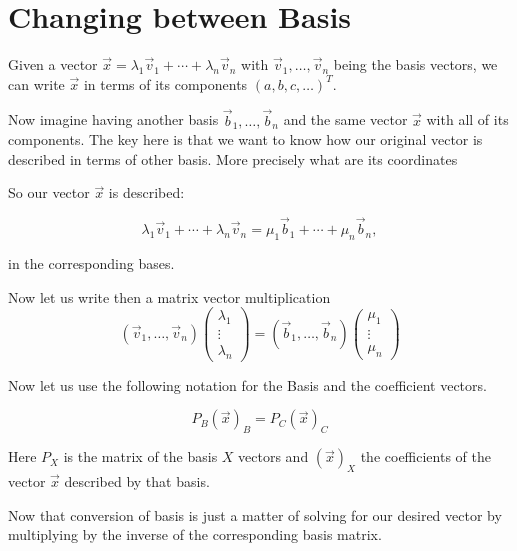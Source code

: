 \newpage
\section{Changing between Basis}

Given a vector \(\vec{x} = \lambda_1 \vec{v}_1 + \cdots + \lambda_n \vec{v}_n\) 
with \(\vec{v}_1, \dots, \vec{v}_n\)
being the basis vectors, we can write \(\vec{x}\) in terms of its components \({(a, b, c, \dots)}^T\).
\vspace{\baselineskip}

Now imagine having another basis \(\vec{b}_1, \dots, \vec{b}_n\) and the same vector \(\vec{x}\)
with all of its components. The key here is that we want to know how our original
vector is described in terms of other basis. More precisely what are its coordinates
\vspace{\baselineskip}

So our vector \(\vec{x}\) is described:

\[\lambda_1 \vec{v}_1 + \cdots + \lambda_n \vec{v}_n = \mu_1 \vec{b}_1 + \cdots + \mu_n \vec{b}_n,\]

in the corresponding bases.
\vspace{\baselineskip}

Now let us write then a matrix vector multiplication
\[
(\vec{v}_1, \dots, \vec{v}_ n) 
\begin{pmatrix} \lambda_1 \\ \vdots \\ \lambda_n \end{pmatrix}
 =
(\vec{b}_1, \dots, \vec{b}_ n) 
\begin{pmatrix} \mu_1 \\ \vdots \\ \mu_n \end{pmatrix}
\]

Now let us use the following notation for the Basis and the coefficient vectors.

\[P_B {(\vec{x})}_B = P_C {(\vec{x})}_C\]

Here \(P_{X}\) is the matrix of the basis \(X\) vectors and \({(\vec{x})}_X\) the coefficients of the
vector \(\vec{x}\) described by that basis.
\vspace{\baselineskip}

Now that conversion of basis is just a matter of solving for 
our desired vector by multiplying
by the inverse of the corresponding basis matrix.
\vspace{\baselineskip}

